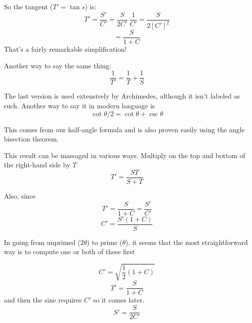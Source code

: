 \documentclass[11pt, oneside]{article}
\begin{document}
So the tangent ($T' = \tan s$) is:
\[ T' = \frac{S'}{C'} = \frac{S}{2C'} \ \frac{1}{C'} = \frac{S}{2 [C']^2} \]
\[ = \frac{S}{1 + C} \]
That's a fairly remarkable simplification!

Another way to say the same thing:
\[ \frac{1}{T'} = \frac{1}{T} + \frac{1}{S} \]

The last version is used extensively by Archimedes, although it isn't labeled as such.  Another way to say it in modern language is
\[ \cot \theta/2 = \cot \theta + \csc \theta \]

This comes from our half-angle formula and is also proven easily using the angle bisection theorem.

This result can be massaged in various ways.  Multiply on the top and bottom of the right-hand side by $T$
\[ T' = \frac{ST}{S + T} \]

Also, since
\[ T'  = \frac{S}{1 + C} = \frac{S'}{C'} \]
\[ C' = \frac{S'(1+C)}{S} \]

In going from unprimed ($2 \theta$) to prime ($\theta$), it seems that the most straightforward way is to compute one or both of these first

\[ C' = \sqrt{\frac{1}{2} (1 + C)}  \]
\[ T'  = \frac{S}{1 + C} \]
and then the sine requires $C'$ so it comes later.
\[ S' = \frac{S}{2 C'} \]
\end{document}
